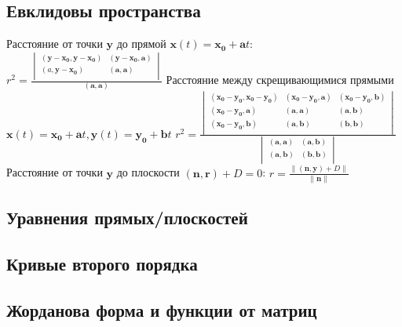 \subsection{Евклидовы пространства}
Расстояние от точки $\boldsymbol{y}$ до прямой
$\boldsymbol{x}(t) = \boldsymbol{x_0} + \boldsymbol{a}t$:
$\displaystyle r^2 = \frac{
	\begin{vmatrix}
		(\boldsymbol{y}-\boldsymbol{x_0}, \boldsymbol{y}-\boldsymbol{x_0}) & (\boldsymbol{y}-\boldsymbol{x_0}, \boldsymbol{a}) \\
		(a, \boldsymbol{y}-\boldsymbol{x_0}) & (\boldsymbol{a}, \boldsymbol{a}) \\
	\end{vmatrix}
}{(\boldsymbol{a}, \boldsymbol{a})} $
Расстояние между скрещивающимися прямыми
$ \boldsymbol{x}(t) = \boldsymbol{x_0} + \boldsymbol{a}t, \boldsymbol{y}(t) = \boldsymbol{y_0} + \boldsymbol{b}t $
$\displaystyle r^2 = \frac{
	\begin{vmatrix}
		(\boldsymbol{x_0}-\boldsymbol{y_0}, \boldsymbol{x_0}-\boldsymbol{y_0}) & (\boldsymbol{x_0}-\boldsymbol{y_0}, \boldsymbol{a}) & (\boldsymbol{x_0}-\boldsymbol{y_0}, \boldsymbol{b}) \\
		(\boldsymbol{x_0}-\boldsymbol{y_0}, \boldsymbol{a}) & (\boldsymbol{a}, \boldsymbol{a}) & (\boldsymbol{a}, \boldsymbol{b}) \\
		(\boldsymbol{x_0}-\boldsymbol{y_0}, \boldsymbol{b}) & (\boldsymbol{a}, \boldsymbol{b}) & (\boldsymbol{b}, \boldsymbol{b}) \\
	\end{vmatrix}
}{
	\begin{vmatrix}
		(\boldsymbol{a}, \boldsymbol{a}) & (\boldsymbol{a}, \boldsymbol{b}) \\
		(\boldsymbol{a}, \boldsymbol{b}) & (\boldsymbol{b}, \boldsymbol{b}) \\
	\end{vmatrix}
} $
Расстояние от точки $\boldsymbol{y}$ до плоскости $ (\boldsymbol{n}, \boldsymbol{r}) + D = 0 $:
$\displaystyle r = \frac{\|(\boldsymbol{n}, \boldsymbol{y}) + D\|}{\|\boldsymbol{n}\|} $
\subsection{Уравнения прямых/плоскостей}
\subsection{Кривые второго порядка}
\subsection{Жорданова форма и функции от матриц}
